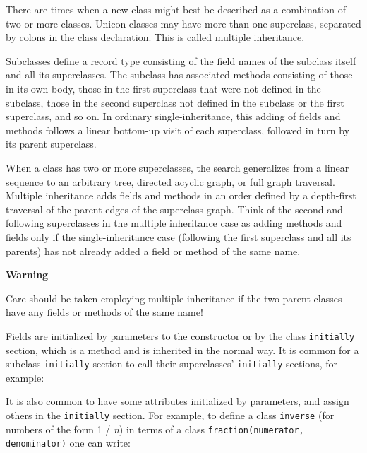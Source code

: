 There are times when a new class might best
be described as a combination of two or more classes. Unicon classes
may have more than one superclass, separated by colons in the class
declaration. This is called multiple inheritance.

Subclasses define a record type consisting of the field names of the
subclass itself and all its superclasses. The subclass has associated
methods consisting of those in its own body, those in the first
superclass that were not defined in the subclass, those in the second
superclass not defined in the subclass or the first superclass, and so
on. In ordinary single-inheritance, this adding of fields and methods
follows a linear bottom-up visit of each superclass,
followed in turn by its parent superclass. 

When a class has two or more superclasses, the search generalizes from a
linear sequence to an arbitrary tree, directed acyclic
graph, or full graph traversal. 
Multiple inheritance adds fields and
methods in an order defined by a depth-first traversal of the parent
edges of the superclass graph. Think of the second and following
superclasses in the
multiple inheritance case as adding methods and fields only if the
single-inheritance case (following the first superclass and all its
parents) has not already added a field or method of the same name. 

{\sffamily\bfseries
Warning}

{\sffamily
Care should be taken employing multiple inheritance if the two parent
classes have any fields or methods of the same name! }

Fields are initialized by parameters to the constructor or by the
class \texttt{initially} section, which is a method and is
inherited in the normal way. It is common for a subclass \texttt{initially}
section to call their superclasses'
\texttt{initially} sections, for example:


\noindent
It is also common to have some attributes initialized by parameters, and
assign others in the \texttt{initially} section. For example, to define a
class \texttt{inverse} (for numbers of the form 1 / \textit{n}) in terms
of a class \texttt{fraction(numerator, denominator)} one can write: 

